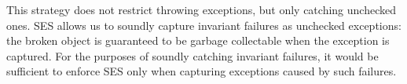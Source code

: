 
\noindent This strategy does not restrict throwing exceptions, but only catching unchecked ones.
SES allows us to soundly capture invariant failures as unchecked exceptions: 
the broken object is guaranteed to be garbage collectable when the exception is captured. For the purposes of soundly catching invariant failures, it would be sufficient to enforce SES only when capturing exceptions caused by such failures.





% 





